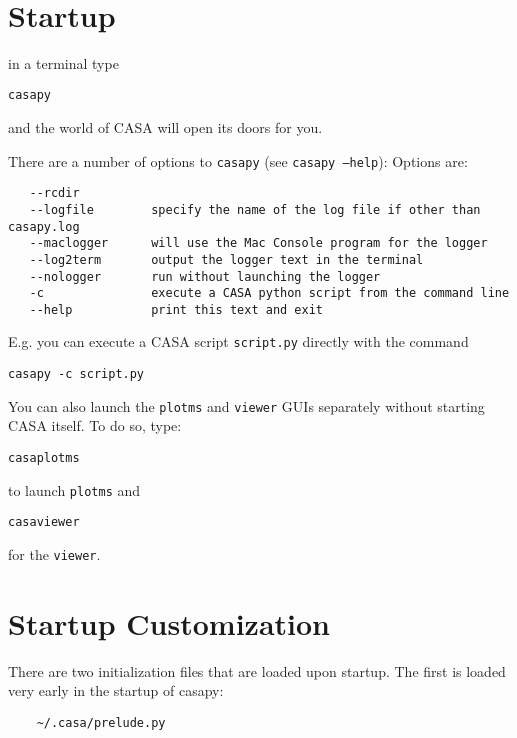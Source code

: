\


\section{Startup}
\label{section:install.startup}

in a terminal type\\
\small
\begin{verbatim}
casapy
\end{verbatim}
\normalsize

and the world of CASA will open its doors for you. 

There are a number of options to {\tt casapy} (see {\tt casapy --help}):
Options are: 
\small
\begin{verbatim}
   --rcdir            
   --logfile        specify the name of the log file if other than casapy.log
   --maclogger      will use the Mac Console program for the logger
   --log2term       output the logger text in the terminal
   --nologger       run without launching the logger
   -c               execute a CASA python script from the command line 
   --help           print this text and exit
\end{verbatim}
\normalsize

E.g. you can execute a CASA script {\tt script.py} directly with the command
\small
\begin{verbatim}
casapy -c script.py
\end{verbatim}
\normalsize


You can also launch the {\tt plotms} and {\tt viewer} GUIs separately
without starting CASA itself. To do so, type:

\small
\begin{verbatim}
casaplotms
\end{verbatim}
\normalsize
to launch {\tt plotms} and 
\small
\begin{verbatim}
casaviewer
\end{verbatim}
\normalsize
for the {\tt viewer}.




\section{Startup Customization}
\label{section:install.customization}

There are two initialization files that are loaded upon startup. The
first is loaded very early in the startup of casapy:

\small
\begin{verbatim}
	~/.casa/prelude.py
\end{verbatim}
\normalsize

